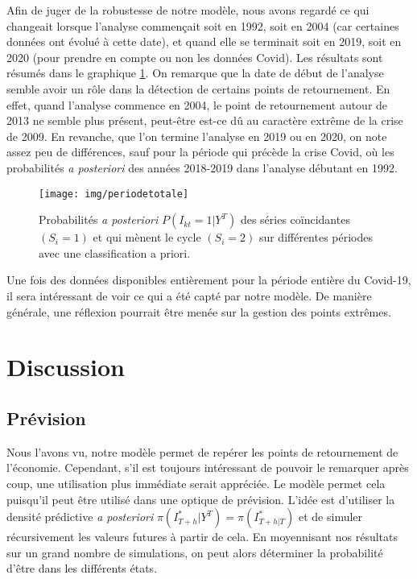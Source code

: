 \documentclass[10pt,french,french]{article}
\begin{document}
Afin de juger de la robustesse de notre modèle, nous avons regardé ce qui changeait lorsque l'analyse commençait soit en 1992, soit en 2004 (car certaines données ont évolué à cette date), et quand elle se terminait soit en 2019, soit en 2020 (pour prendre en compte ou non les données Covid). Les résultats sont résumés dans le graphique \ref{fig:impactdate}. On remarque que la date de début de l'analyse semble avoir un rôle dans la détection de certains points de retournement. En effet, quand l'analyse commence en 2004, le point de retournement autour de 2013 ne semble plus présent, peut-être est-ce dû au caractère extrême de la crise de 2009. En revanche, que l'on termine l'analyse en 2019 ou en 2020, on note assez peu de différences, sauf pour la période qui précède la crise Covid, où les probabilités \emph{a posteriori} des années 2018-2019 dans l'analyse débutant en 1992.

\begin{figure}[h]
{\centering
\texttt{[image: img/periodetotale]}
\caption{Probabilités \textit{a posteriori} $P(I_{kt}=1|Y^T)$ des séries coïncidantes $(S_i=1)$ et qui mènent le cycle $(S_i=2)$ sur différentes périodes avec une classification a priori.}\label{fig:impactdate}}
\end{figure}

Une fois des données disponibles entièrement pour la période entière du Covid-19, il sera intéressant de voir ce qui a été capté par notre modèle. De manière générale, une réflexion pourrait être menée sur la gestion des points extrêmes.

\hypertarget{discussion}{%
\section{Discussion}\label{discussion}}

\hypertarget{pruxe9vision}{%
\subsection{Prévision}\label{pruxe9vision}}

Nous l'avons vu, notre modèle permet de repérer les points de retournement de l'économie.
Cependant, s'il est toujours intéressant de pouvoir le remarquer après coup, une utilisation plus immédiate serait appréciée.
Le modèle permet cela puisqu'il peut être utilisé dans une optique de prévision.
L'idée est d'utiliser la densité prédictive \emph{a posteriori} \(\pi(I^*_{T+h}|Y^T) = \pi(I^*_{T+h|T})\) et de simuler récursivement les valeurs futures à partir de cela.
En moyennisant nos résultats sur un grand nombre de simulations, on peut alors déterminer la probabilité d'être dans les différents états.
\end{document}
